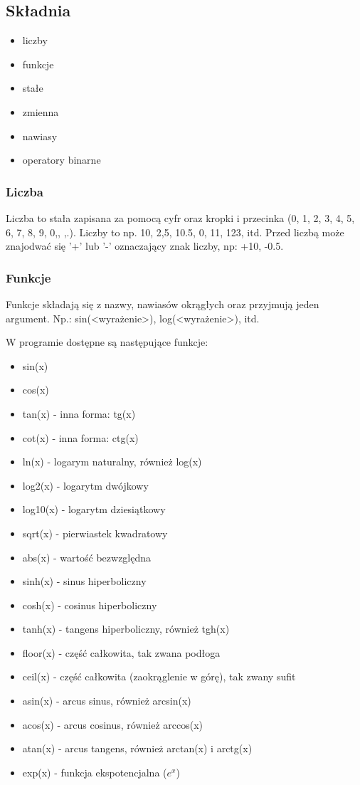 \documentclass[a4paper]{article}
\begin{document}
\subsection{Składnia}
\begin{itemize}
    \item liczby
    \item funkcje
    \item stałe
    \item zmienna
    \item nawiasy
    \item operatory binarne
\end{itemize}

\subsubsection{Liczba}

Liczba to stała zapisana za pomocą cyfr oraz kropki i przecinka ({0, 1, 2, 3, 4, 5, 6, 7, 8, 9, 0,, ,.}). Liczby to np. 10, 2,5, 10.5, 0, 11, 123, itd.
Przed liczbą może znajodwać się '+' lub '-' oznaczający znak liczby, np: +10, -0.5.

\subsubsection{Funkcje}

Funkcje składają się z nazwy, nawiasów okrągłych oraz przyjmują jeden argument. Np.: sin(<wyrażenie>), log(<wyrażenie>), itd.

W programie dostępne są następujące funkcje:
\begin{itemize}
    \item sin(x)
    \item cos(x)
    \item tan(x) - inna forma: tg(x)
    \item cot(x) - inna forma: ctg(x)
    \item ln(x) - logarym naturalny, również log(x)
    \item log2(x) - logarytm dwójkowy
    \item log10(x) - logarytm dziesiątkowy
    \item sqrt(x) - pierwiastek kwadratowy
    \item abs(x) - wartość bezwzględna
    \item sinh(x) - sinus hiperboliczny
    \item cosh(x) - cosinus hiperboliczny
    \item tanh(x) - tangens hiperboliczny, również tgh(x)
    \item floor(x) - część całkowita, tak zwana podłoga
    \item ceil(x) - część całkowita (zaokrąglenie w górę), tak zwany sufit
    \item asin(x) - arcus sinus, również arcsin(x)
    \item acos(x) - arcus cosinus, również arccos(x)
    \item atan(x) - arcus tangens, również arctan(x) i arctg(x)
    \item exp(x) - funkcja ekspotencjalna ($e^x$)
\end{itemize}
\end{document}
